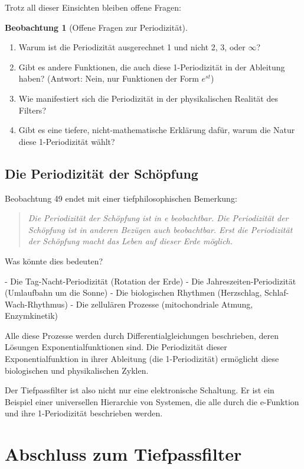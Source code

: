 \documentclass[a4paper,12pt,twoside]{report}
\theoremstyle{definition}
\newtheorem{beobachtung}{Beobachtung}
\begin{document}
Trotz all dieser Einsichten bleiben offene Fragen:

\begin{beobachtung}[Offene Fragen zur Periodizität]
	\begin{enumerate}
		\item Warum ist die Periodizität ausgerechnet 1 und nicht 2, 3, oder $\infty$?
		\item Gibt es andere Funktionen, die auch diese 1-Periodizität in der Ableitung haben? (Antwort: Nein, nur Funktionen der Form $e^{st}$)
		\item Wie manifestiert sich die Periodizität in der physikalischen Realität des Filters?
		\item Gibt es eine tiefere, nicht-mathematische Erklärung dafür, warum die Natur diese 1-Periodizität wählt?
	\end{enumerate}
\end{beobachtung}

\subsection{Die Periodizität der Schöpfung}

Beobachtung 49 endet mit einer tiefphilosophischen Bemerkung:

\begin{quote}
	\textit{Die Periodizität der Schöpfung ist in e beobachtbar. Die Periodizität der Schöpfung ist in anderen Bezügen auch beobachtbar. Erst die Periodizität der Schöpfung macht das Leben auf dieser Erde möglich.}
\end{quote}

Was könnte dies bedeuten?

- Die Tag-Nacht-Periodizität (Rotation der Erde)
- Die Jahreszeiten-Periodizität (Umlaufbahn um die Sonne)
- Die biologischen Rhythmen (Herzschlag, Schlaf-Wach-Rhythmus)
- Die zellulären Prozesse (mitochondriale Atmung, Enzymkinetik)

Alle diese Prozesse werden durch Differentialgleichungen beschrieben, deren Lösungen Exponentialfunktionen sind. Die Periodizität dieser Exponentialfunktion in ihrer Ableitung (die 1-Periodizität) ermöglicht diese biologischen und physikalischen Zyklen.

Der Tiefpassfilter ist also nicht nur eine elektronische Schaltung. Er ist ein Beispiel einer universellen Hierarchie von Systemen, die alle durch die e-Funktion und ihre 1-Periodizität beschrieben werden.

\section{Abschluss zum Tiefpassfilter}
\end{document}
